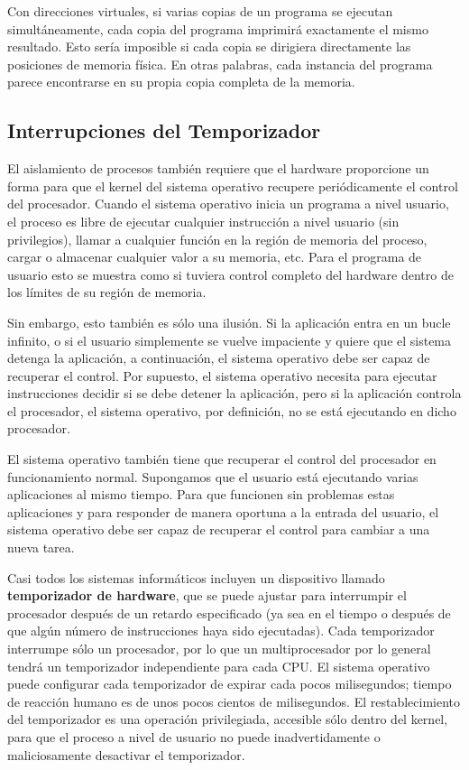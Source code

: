 \documentclass[10pt]{book}
\begin{document}
Con direcciones virtuales, si varias copias de un programa se ejecutan simultáneamente, cada copia del programa imprimirá exactamente el mismo resultado. Esto sería imposible si cada copia se dirigiera directamente las posiciones de memoria física. En otras palabras, cada instancia del programa parece encontrarse en su propia copia completa de la memoria.


\subsection{Interrupciones del Temporizador}
El aislamiento de procesos también requiere que el hardware proporcione un forma para que el kernel del sistema operativo recupere periódicamente el control del procesador. Cuando el sistema operativo inicia un programa a nivel usuario, el proceso es libre de ejecutar cualquier instrucción a nivel usuario (sin privilegios), llamar a cualquier función en la región de memoria del proceso, cargar o almacenar cualquier valor a su memoria, etc. Para el programa de usuario esto se muestra como si tuviera control completo del hardware dentro de los límites de su región de memoria.

Sin embargo, esto también es sólo una ilusión. Si la aplicación entra en un bucle infinito, o si el usuario simplemente se vuelve impaciente y quiere que el sistema detenga la aplicación, a continuación, el sistema operativo debe ser capaz de recuperar el control. Por supuesto, el sistema operativo necesita para ejecutar instrucciones decidir si se debe detener la aplicación, pero si la aplicación controla el procesador, el sistema operativo, por definición, no se está ejecutando en dicho procesador.

El sistema operativo también tiene que recuperar el control del procesador en funcionamiento normal. Supongamos que el usuario está ejecutando varias aplicaciones al mismo tiempo. Para que funcionen sin problemas estas aplicaciones y para responder de manera oportuna a la entrada del usuario, el sistema operativo debe ser capaz de recuperar el control para cambiar a una nueva tarea.

Casi todos los sistemas informáticos incluyen un dispositivo llamado \textbf{temporizador de hardware}, que se puede ajustar para interrumpir el procesador después de un retardo especificado (ya sea en el tiempo o después de que algún número de instrucciones haya sido ejecutadas). Cada temporizador interrumpe sólo un procesador, por lo que un multiprocesador por lo general tendrá un temporizador independiente para cada CPU. El sistema operativo puede configurar cada temporizador de expirar cada pocos milisegundos; tiempo de reacción humano es de unos pocos cientos de milisegundos. El restablecimiento del temporizador es una operación privilegiada, accesible sólo dentro del kernel, para que el proceso a nivel de usuario no puede inadvertidamente o maliciosamente desactivar el temporizador.
\end{document}
